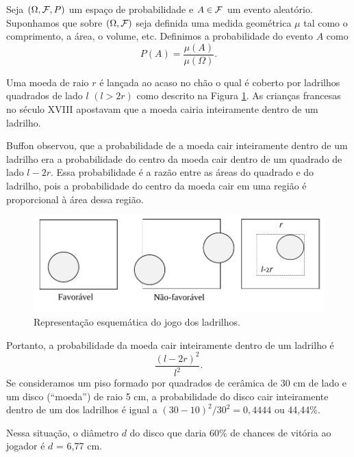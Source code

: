 \begin{frame}
\begin{defi}  Seja $(\Omega ,{\cal F}, P)$ um espaço de probabilidade e  $A \in {\cal F}$ um evento aleatório. Suponhamos que sobre $(\Omega ,{\cal F})$ seja definida uma medida geométrica $\mu$ tal como o comprimento, a área, o volume, etc. Definimos a probabilidade do evento $A$ como 
	\begin{equation}
	\label{pgeo}
	P(A) = \frac{\mu(A)}{\mu(\Omega)}.
	\end{equation}
\end{defi}

\begin{exem} 
	Uma moeda de raio $r$ é lançada ao acaso no chão o qual é coberto por
	ladrilhos quadrados de lado $l$ $(l > 2r)$ como descrito na Figura \ref{fig7}. As crianças francesas no século XVIII apostavam que a moeda
	cairia inteiramente dentro de um ladrilho. 
	
	Buffon observou, que a probabilidade de a moeda cair inteiramente dentro
	de um ladrilho era a probabilidade do centro da moeda cair dentro de um
	quadrado de lado $l - 2r$. Essa probabilidade é a razão entre as áreas do quadrado e do ladrilho,
	pois a probabilidade do centro da moeda cair em uma região é proporcional
	à área dessa região.
	
	
\end{exem}
\end{frame}

\begin{frame}

\begin{figure}[!htb]
\begin{center}
	\includegraphics[angle=0, scale=0.5]{fig7.pdf}
\end{center}
\caption{\label{fig7} Representação esquemática do jogo dos ladrilhos.
}
\end{figure} 
Portanto, a probabilidade da moeda cair inteiramente
dentro de um ladrilho é $$ \frac{( l-2r )^2}{l^2}.$$
Se consideramos um piso formado por quadrados de cerâmica de 30 cm de lado e um disco (``moeda'') de raio 5 cm, a probabilidade do disco cair inteiramente dentro de um dos ladrilhos é igual a $(30-10)^2/ 30^2 = 0,4444$ ou 44,44\%.


Nessa situação, o diâmetro $d$ do disco que daria 60\% de chances de vitória ao jogador é $d$ = 6,77 cm.
\end{frame}


